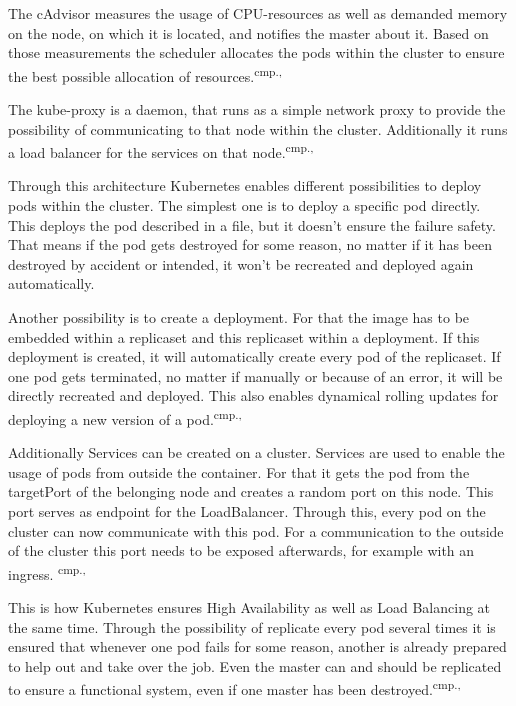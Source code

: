 The cAdvisor measures the usage of CPU-resources as well as demanded memory on the node, on which it is located, and notifies the master about it. Based on those measurements the scheduler allocates the pods within the cluster to ensure the best possible allocation of resources.\textsuperscript{cmp.\cite{19}, \cite{22}}

The kube-proxy is a daemon, that runs as a simple network proxy to provide the possibility of communicating to that node within the cluster. Additionally it runs a load balancer for the services on that node.\textsuperscript{cmp.\cite{19}, \cite{22}}

Through this architecture Kubernetes enables different possibilities to deploy pods within the cluster. The simplest one is to deploy a specific pod directly. This deploys the pod described in a file, but it doesn't ensure the failure safety. That means if the pod gets destroyed for some reason, no matter if it has been destroyed by accident or intended, it won't be recreated and deployed again automatically. 

Another possibility is to create a deployment. For that the image has to be embedded within a replicaset and this replicaset within a deployment. If this deployment is created, it will automatically create every pod of the replicaset. If one pod gets terminated, no matter if manually or because of an error, it will be directly recreated and deployed. This also enables dynamical rolling updates for deploying a new version of a pod.\textsuperscript{cmp.\cite{19}, \cite{23}}

Additionally Services can be created on a cluster. Services are used to enable the usage of pods from outside the container. For that it gets the pod from the targetPort of the belonging node and creates a random port on this node. This port serves as endpoint for the LoadBalancer. Through this, every pod on the cluster can now communicate with this pod. For a communication to the outside of the cluster this port needs to be exposed afterwards, for example with an ingress. \textsuperscript{cmp.\cite{19}, \cite{23}}

This is how Kubernetes ensures High Availability as well as Load Balancing at the same time. Through the possibility of replicate every pod several times it is ensured that whenever one pod fails for some reason, another is already prepared to help out and take over the job. Even the master can and should be replicated to ensure a functional system, even if one master has been destroyed.\textsuperscript{cmp.\cite{19}, \cite{23}}

